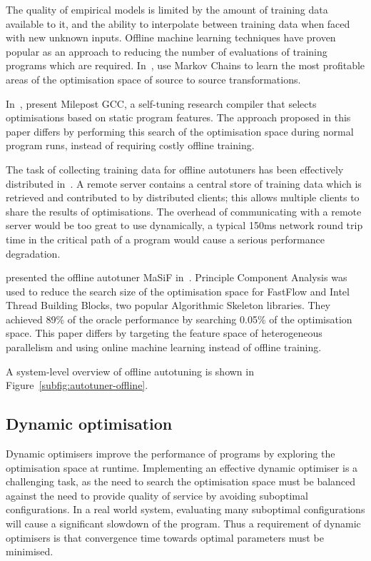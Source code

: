 The quality of empirical models is limited by the amount of training
data available to it, and the ability to interpolate between training
data when faced with new unknown inputs. Offline machine learning
techniques have proven popular as an approach to reducing the number
of evaluations of training programs which are
required. In~\cite{Agakov}, \citeauthor{Agakov} use Markov Chains to
learn the most profitable areas of the optimisation space of source to
source transformations.

In~\cite{Fursin2011}, \citeauthor{Fursin2011} present Milepost GCC, a
self-tuning research compiler that selects optimisations based on
static program features. The approach proposed in this paper differs by
performing this search of the optimisation space during normal program
runs, instead of requiring costly offline training.

The task of collecting training data for offline autotuners has been
effectively distributed in~\cite{Fursin2014, Auler2014}. A remote
server contains a central store of training data which is retrieved
and contributed to by distributed clients; this allows multiple
clients to share the results of optimisations. The overhead of
communicating with a remote server would be too great to use
dynamically, a typical 150ms network round trip time in the critical
path of a program would cause a serious performance degradation.

\citeauthor{Collins2013} presented the offline autotuner MaSiF
in~\cite{Collins2013}. Principle Component Analysis was used to reduce
the search size of the optimisation space for FastFlow and Intel
Thread Building Blocks, two popular Algorithmic Skeleton
libraries. They achieved 89\% of the oracle performance by searching
0.05\% of the optimisation space. This paper differs by targeting the
feature space of heterogeneous parallelism and using online machine
learning instead of offline training.

A system-level overview of offline autotuning is shown in
Figure~\ref{subfig:autotuner-offline}.

\subsection{Dynamic optimisation}\label{subsec:dynamic-optimisation}
Dynamic optimisers improve the performance of programs by exploring
the optimisation space at runtime. Implementing an effective dynamic
optimiser is a challenging task, as the need to search the
optimisation space must be balanced against the need to provide
quality of service by avoiding suboptimal configurations. In a real
world system, evaluating many suboptimal configurations will cause a
significant slowdown of the program. Thus a requirement of dynamic
optimisers is that convergence time towards optimal parameters must be
minimised.

